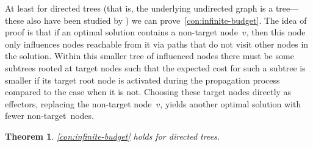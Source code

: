 \documentclass{article}
\newtheorem{theorem}{Theorem}
\begin{document}
At least for directed trees
(that is, the underlying undirected graph is a tree---these also have
been studied by \citet{LTGMH10}) 
we can prove~\autoref{con:infinite-budget}.
The idea of proof is that if an optimal solution contains a non-target
node~$v$, then this node only influences nodes reachable from it via paths that do not visit other nodes in the solution. Within this smaller tree of influenced nodes there must be some subtrees rooted at target nodes such that the expected cost for such a subtree is smaller if its target root node is activated during the propagation process compared to the case when it is not. Choosing these target nodes directly as effectors, replacing the non-target node~$v$, yields another optimal solution with fewer non-target~nodes.

\begin{theorem}\label{thm:conjectureForTrees}
  \autoref{con:infinite-budget} holds for directed trees.
\end{theorem}
\end{document}
